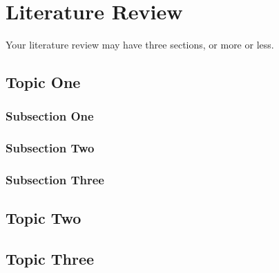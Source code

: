 \chapter{Literature Review}
\label{cha:Literature}      %

Your literature review may have three sections, or more or less.
 
\section{Topic One}
\lipsum[1-3]
\subsection{Subsection One}
\lipsum[4-6]
\subsection{Subsection Two}
\lipsum[7-9]
\subsection{Subsection Three}
\lipsum[10-12]
\section{Topic Two}
\lipsum[13-16]
\section{Topic Three}
\lipsum[17-20]